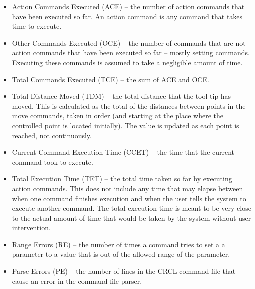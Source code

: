 \begin{itemize}

\item \sf Action Commands Executed (ACE) \rm -- the number of action commands that
  have been executed so far. An action command is any command that takes
  time to execute.\\

\item \sf Other Commands Executed (OCE) \rm -- the number of commands that are
  not action commands that have been executed so far -- mostly setting
  commands. Executing these commands is assumed to take a negligible amount
  of time.\\

 \item \sf Total Commands Executed (TCE) \rm -- the sum of ACE and OCE.\\

\item \sf Total Distance Moved (TDM) \rm -- the total distance that the
  tool tip has moved.  This is calculated as the total of the distances between
  points in
  the move commands, taken in order (and starting at the place where the
  controlled point is located initially). The value is updated as each point
  is reached, not continuously.\\

 \item \sf Current Command Execution Time (CCET) \rm -- the time that the current
   command took to execute.\\

\item \sf Total Execution Time (TET) \rm -- the total time taken so far by
  executing action commands. This does not include any time that may elapse
  between when one command finishes execution and when the user tells the
  system to execute another command. The total execution time is
  meant to be very close to the actual amount of time that would be taken
  by the system without user intervention.\\

\item \sf Range Errors (RE) \rm -- the number of times a command tries to set a
  a parameter to a value that is out of the allowed range of the parameter.\\

\item \sf Parse Errors  (PE) \rm -- the number of lines in the CRCL command file
  that cause an error in the command file parser. \\


\end{itemize}

